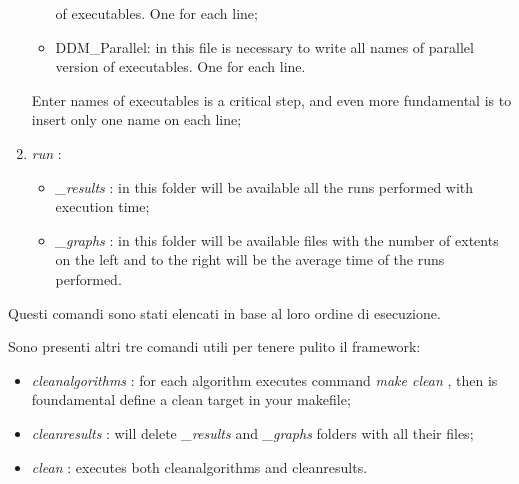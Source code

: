 \documentclass[a4paper,11pt]{report}
\newcommand{\folder}[1]{
  \textcolor{foldercolor}{\textit{#1}}
}
\newcommand{\command}[1]{
  \textcolor{commandcolor}{\textit{#1}}
}
\begin{document}
\begin{enumerate}
\begin{itemize}
   of executables. One for each line;
   \item DDM\_Parallel: in this file is necessary to write all names of parallel version of
   executables. One for each line.
  \end{itemize}
  Enter names of executables is a critical step, and even more fundamental is to insert only 
  one name on each line;
  \item \command{run}:
  \begin{itemize}
   \item \folder{\_results}: in this folder will be available all the runs performed with 
   execution time;
   \item \folder{\_graphs}: in this folder will be available files with the number 
   of extents on the left and to the right will be the average time of the runs performed.
   \end{itemize}
 \end{enumerate}

 Questi comandi sono stati elencati in base al loro ordine di esecuzione.

 Sono presenti altri tre comandi utili per tenere pulito il framework:
 \begin{itemize}
  \item \command{cleanalgorithms}: for each algorithm executes command \command{make clean}, 
  then is foundamental define a clean target in your makefile;
  \item \command{cleanresults}: will delete \folder{\_results} and \folder{\_graphs} folders 
  with all their files;
  \item \command{clean}: executes both cleanalgorithms and cleanresults.
 \end{itemize}
 
\end{document}
